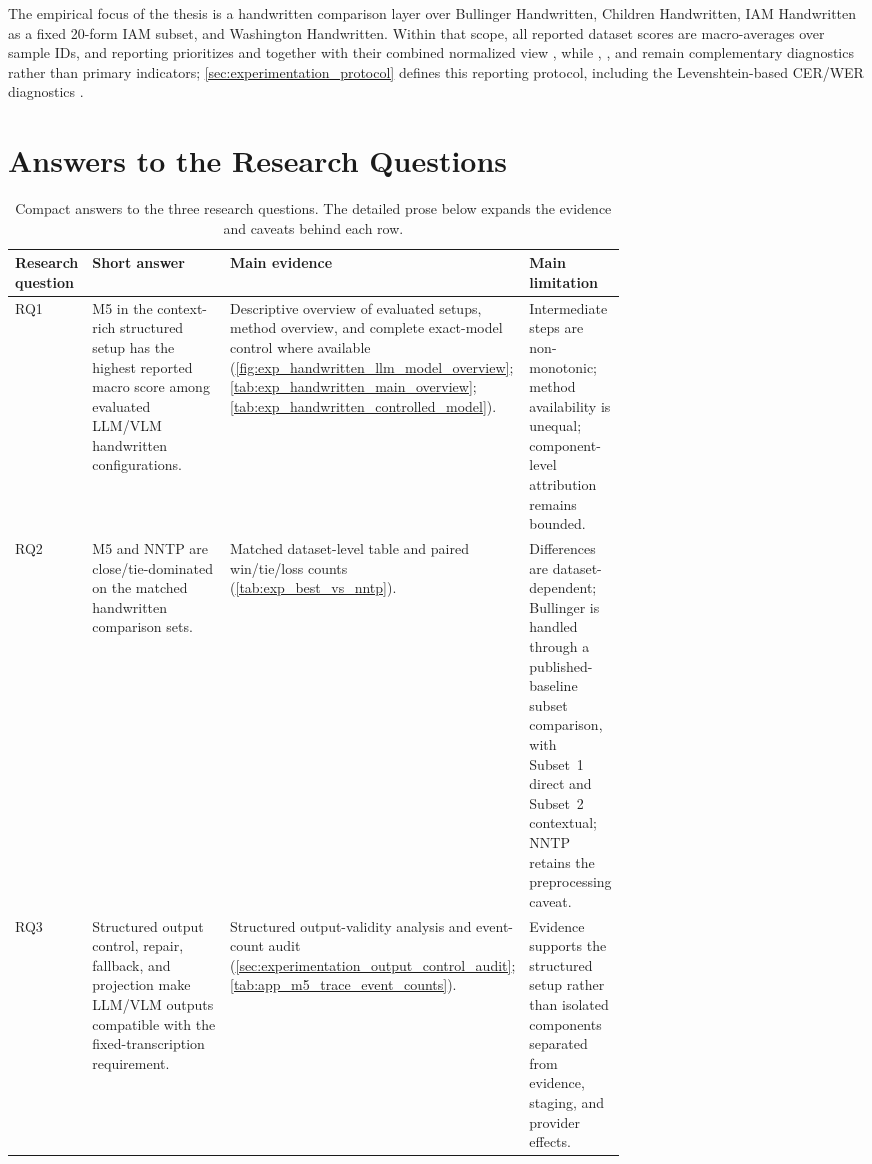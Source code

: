 The empirical focus of the thesis is a handwritten comparison layer over Bullinger Handwritten, Children Handwritten, IAM Handwritten as a fixed 20-form IAM subset, and Washington Handwritten. Within that scope, all reported dataset scores are macro-averages over sample IDs, and reporting prioritizes \LANormForward{} and \LANormReverse{} together with their combined normalized view \LANormCombined, while \LineFOneNorm, \CERNorm, and \WERNorm remain complementary diagnostics rather than primary indicators; \autoref{sec:experimentation_protocol} defines this reporting protocol, including the Levenshtein-based CER/WER diagnostics .

\section{Answers to the Research Questions}
\label{sec:conclusion_rq_answers}

\begin{table}[H]
  \centering
  \caption{Compact answers to the three research questions. The detailed prose below expands the evidence and caveats behind each row.}
  \label{tab:conclusion_rq_compact_answers}
  \footnotesize
  \setlength{\tabcolsep}{3pt}
  \renewcommand{\arraystretch}{1.12}
  \begin{tabularx}{\linewidth}{@{}>{\raggedright\arraybackslash}p{0.12\linewidth}>{\raggedright\arraybackslash}p{0.28\linewidth}>{\raggedright\arraybackslash}p{0.31\linewidth}Y@{}}
    \toprule
    \textbf{Research question} & \textbf{Short answer} & \textbf{Main evidence} & \textbf{Main limitation} \\
    \midrule
    RQ1 & M5 in the context-rich structured setup has the highest reported macro score among evaluated LLM/VLM handwritten configurations. & Descriptive overview of evaluated setups, method overview, and complete exact-model control where available (\autoref{fig:exp_handwritten_llm_model_overview}; \autoref{tab:exp_handwritten_main_overview}; \autoref{tab:exp_handwritten_controlled_model}). & Intermediate steps are non-monotonic; method availability is unequal; component-level attribution remains bounded. \\
    RQ2 & M5 and NNTP are close/tie-dominated on the matched handwritten comparison sets. & Matched dataset-level table and paired win/tie/loss counts (\autoref{tab:exp_best_vs_nntp}). & Differences are dataset-dependent; Bullinger is handled through a published-baseline subset comparison, with Subset~1 direct and Subset~2 contextual; NNTP retains the preprocessing caveat. \\
    RQ3 & Structured output control, repair, fallback, and projection make LLM/VLM outputs compatible with the fixed-transcription requirement. & Structured output-validity analysis and event-count audit (\autoref{sec:experimentation_output_control_audit}; \autoref{tab:app_m5_trace_event_counts}). & Evidence supports the structured setup rather than isolated components separated from evidence, staging, and provider effects. \\
    \bottomrule
  \end{tabularx}
\end{table}

